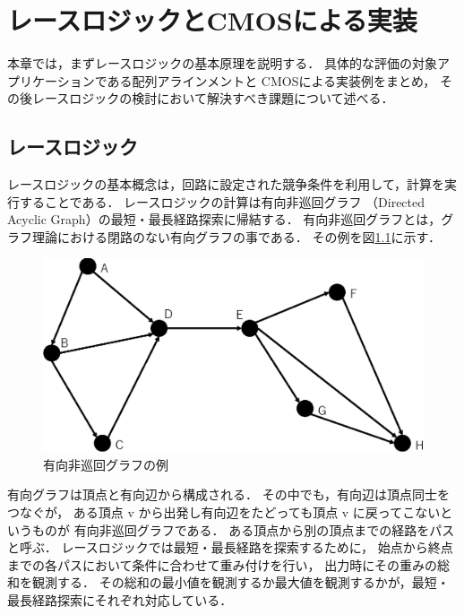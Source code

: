 \chapter{レースロジックとCMOSによる実装}
本章では，まずレースロジックの基本原理を説明する．
具体的な評価の対象アプリケーションである配列アラインメントと
CMOSによる実装例をまとめ，
その後レースロジックの検討において解決すべき課題について述べる．

\section{レースロジック}
レースロジックの基本概念は，回路に設定された競争条件を利用して，計算を実行することである．
レースロジックの計算は有向非巡回グラフ
（Directed Acyclic Graph）の最短・最長経路探索に帰結する．
有向非巡回グラフとは，グラフ理論における閉路のない有向グラフの事である．
その例を図\ref{fig:DAG}に示す．
\begin{figure}[t!]
\begin{center}
\includegraphics[keepaspectratio,scale=0.5]{fig/2/DAG.eps}
\caption{有向非巡回グラフの例}
\label{fig:DAG}
\end{center}
\end{figure}
有向グラフは頂点と有向辺から構成される．
その中でも，有向辺は頂点同士をつなぐが，
ある頂点 v から出発し有向辺をたどっても頂点 v に戻ってこないというものが
有向非巡回グラフである．
ある頂点から別の頂点までの経路をパスと呼ぶ．
レースロジックでは最短・最長経路を探索するために，
始点から終点までの各パスにおいて条件に合わせて重み付けを行い，
出力時にその重みの総和を観測する．
その総和の最小値を観測するか最大値を観測するかが，最短・最長経路探索にそれぞれ対応している．

